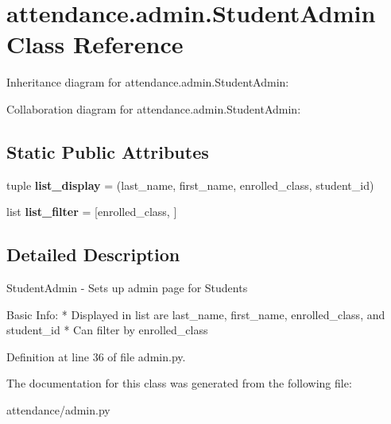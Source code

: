 \hypertarget{classattendance_1_1admin_1_1_student_admin}{}\section{attendance.\+admin.\+Student\+Admin Class Reference}
\label{classattendance_1_1admin_1_1_student_admin}


Inheritance diagram for attendance.\+admin.\+Student\+Admin\+:


Collaboration diagram for attendance.\+admin.\+Student\+Admin\+:
\subsection*{Static Public Attributes}
\begin{DoxyCompactItemize}
\item 
\hypertarget{classattendance_1_1admin_1_1_student_admin_aa5a4662f6143d9d11deaf641f244ee17}{}\label{classattendance_1_1admin_1_1_student_admin_aa5a4662f6143d9d11deaf641f244ee17} 
tuple {\bfseries list\+\_\+display} = (\textquotesingle{}last\+\_\+name\textquotesingle{}, \textquotesingle{}first\+\_\+name\textquotesingle{}, \textquotesingle{}enrolled\+\_\+class\textquotesingle{}, \textquotesingle{}student\+\_\+id\textquotesingle{})
\item 
\hypertarget{classattendance_1_1admin_1_1_student_admin_ae51cedd7d6a7e95853d1b682728d1f92}{}\label{classattendance_1_1admin_1_1_student_admin_ae51cedd7d6a7e95853d1b682728d1f92} 
list {\bfseries list\+\_\+filter} = \mbox{[}\textquotesingle{}enrolled\+\_\+class\textquotesingle{}, \mbox{]}
\end{DoxyCompactItemize}


\subsection{Detailed Description}
\begin{DoxyVerb}StudentAdmin - Sets up admin page for Students

Basic Info:
* Displayed in list are last_name, first_name, enrolled_class, and student_id
* Can filter by enrolled_class
\end{DoxyVerb}
 

Definition at line 36 of file admin.\+py.



The documentation for this class was generated from the following file\+:\begin{DoxyCompactItemize}
\item 
attendance/admin.\+py\end{DoxyCompactItemize}
